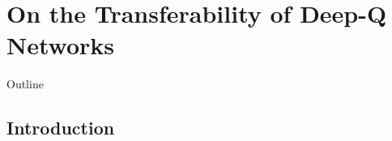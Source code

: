 
\chapter{On the Transferability of Deep-Q Networks} %
\label{ch:dqn_transfer} %

\begin{remark}{Outline}
	




\end{remark}


\section{Introduction}
\label{sec:intro}

